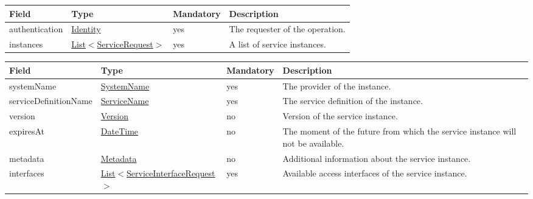 \documentclass[a4paper]{arrowhead}
\newcommand{\pref}[1]{{\textcolor{ArrowheadGrey}{\hyperref[sec:model:primitives:#1]{#1}}}}
\begin{document}
 
\begin{table}[ht!]
\begin{tabularx}{\textwidth}{| p{2.5cm} | p{3.6cm} | p{2cm} | X |} \hline
\rowcolor{gray!33} Field & Type & Mandatory & Description \\ \hline
authentication & \hyperref[sec:model:Identity]{Identity} & yes & The requester of the operation. \\ \hline
instances & \pref{List}$<$\hyperref[sec:model:ServiceRequest]{ServiceRequest}$>$ & yes & A list of service instances. \\ \hline
\end{tabularx}
\end{table}

 
\begin{table}[ht!]
\begin{tabularx}{\textwidth}{| p{3.5cm} | p{4.9cm} | p{2cm} | X |} \hline
\rowcolor{gray!33} Field & Type & Mandatory & Description \\ \hline
systemName & \pref{SystemName} & yes & The provider of the instance. \\ \hline
serviceDefinitionName & \pref{ServiceName} & yes & The service definition of the instance. \\ \hline
version & \pref{Version} & no & Version of the service instance. \\ \hline
expiresAt & \pref{DateTime} & no & The moment of the future from which the service instance will not be available. \\ \hline
metadata &\hyperref[sec:model:Metadata]{Metadata} & no & Additional information about the service instance. \\ \hline
interfaces &  \pref{List}$<$\hyperref[sec:model:ServiceInterfaceRequest]{ServiceInterfaceRequest}$>$ & yes & Available access interfaces of the service instance.  \\ \hline
\end{tabularx}
\end{table}

 
\end{document}
